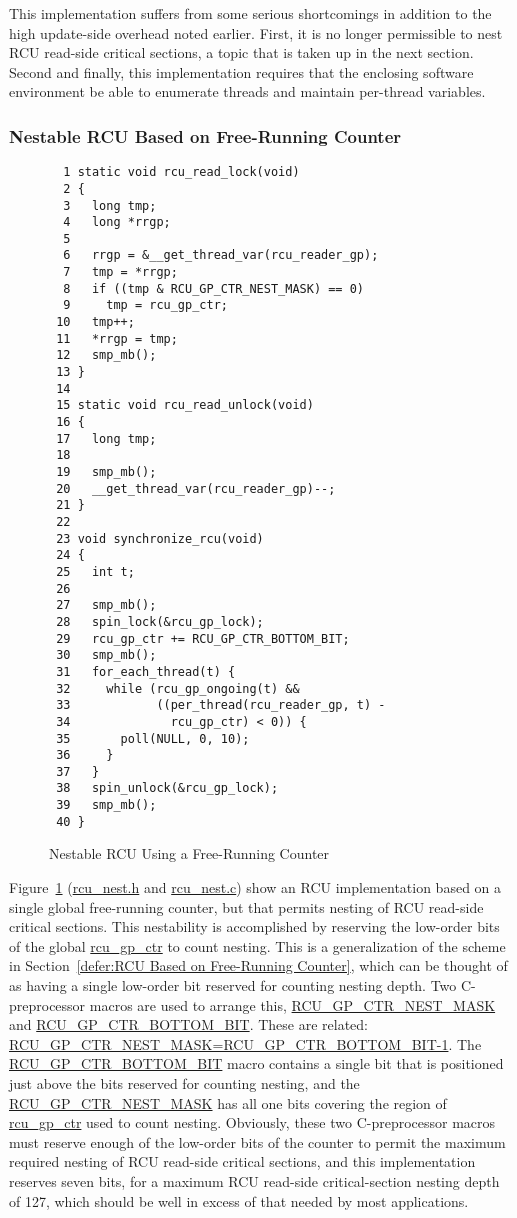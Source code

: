 This implementation suffers from some serious shortcomings in
addition to the high update-side overhead noted earlier.
First, it is no longer permissible to nest RCU read-side critical
sections, a topic that is taken up in the next section.
Second and finally, this implementation requires that the enclosing software
environment be able to enumerate threads and maintain per-thread
variables.

\subsubsection{Nestable RCU Based on Free-Running Counter}
\label{defer:Nestable RCU Based on Free-Running Counter}

\begin{figure}[tbp]
{ \scriptsize
\begin{verbatim}
  1 static void rcu_read_lock(void)
  2 {
  3   long tmp;
  4   long *rrgp;
  5 
  6   rrgp = &__get_thread_var(rcu_reader_gp);
  7   tmp = *rrgp;
  8   if ((tmp & RCU_GP_CTR_NEST_MASK) == 0)
  9     tmp = rcu_gp_ctr;
 10   tmp++;
 11   *rrgp = tmp;
 12   smp_mb();
 13 }
 14 
 15 static void rcu_read_unlock(void)
 16 {
 17   long tmp;
 18 
 19   smp_mb();
 20   __get_thread_var(rcu_reader_gp)--;
 21 }
 22 
 23 void synchronize_rcu(void)
 24 {
 25   int t;
 26 
 27   smp_mb();
 28   spin_lock(&rcu_gp_lock);
 29   rcu_gp_ctr += RCU_GP_CTR_BOTTOM_BIT;
 30   smp_mb();
 31   for_each_thread(t) {
 32     while (rcu_gp_ongoing(t) &&
 33            ((per_thread(rcu_reader_gp, t) -
 34              rcu_gp_ctr) < 0)) {
 35       poll(NULL, 0, 10);
 36     }
 37   }
 38   spin_unlock(&rcu_gp_lock);
 39   smp_mb();
 40 }
\end{verbatim}
}
\caption{Nestable RCU Using a Free-Running Counter}
\label{fig:defer:Nestable RCU Using a Free-Running Counter}
\end{figure}

Figure~\ref{fig:defer:Nestable RCU Using a Free-Running Counter}
(\url{rcu_nest.h} and \url{rcu_nest.c})
show an RCU implementation based on a single global free-running counter,
but that permits nesting of RCU read-side critical sections.
This nestability is accomplished by reserving the low-order bits of the
global \url{rcu_gp_ctr} to count nesting.
This is a generalization of the scheme in
Section~\ref{defer:RCU Based on Free-Running Counter},
which can be thought of as having a single low-order bit reserved
for counting nesting depth.
Two C-preprocessor macros are used to arrange this,
\url{RCU_GP_CTR_NEST_MASK} and
\url{RCU_GP_CTR_BOTTOM_BIT}.
These are related: \url{RCU_GP_CTR_NEST_MASK=RCU_GP_CTR_BOTTOM_BIT-1}.
The \url{RCU_GP_CTR_BOTTOM_BIT} macro contains a single bit that is
positioned just above the bits reserved for counting nesting,
and the \url{RCU_GP_CTR_NEST_MASK} has all one bits covering the
region of \url{rcu_gp_ctr} used to count nesting.
Obviously, these two C-preprocessor macros must reserve enough
of the low-order bits of the counter to permit the maximum required
nesting of RCU read-side critical sections, and this implementation
reserves seven bits, for a maximum RCU read-side critical-section
nesting depth of 127, which should be well in excess of that needed
by most applications.

